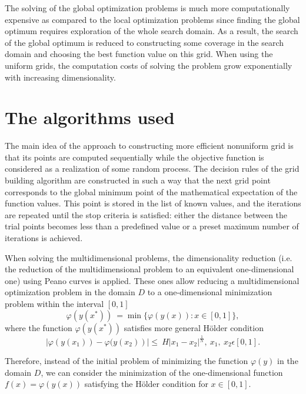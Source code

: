 \documentclass{svproc}
\begin{document}
The solving of the global optimization problems is much more computationally expensive as compared to the local optimization problems since finding the global optimum requires exploration of the whole search domain. As a result, the search of the  global optimum is reduced to constructing some coverage in the search domain and choosing the best function value on this grid. When using the uniform grids, the computation costs of solving the  problem grow exponentially with increasing dimensionality.



\section{The algorithms used}\label{SecA}

The main idea of the approach to constructing more efficient nonuniform grid is that its points are  computed sequentially while the objective function is considered as a realization of some random process. The decision rules of the grid building algorithm are constructed in such a way that the next  grid point corresponds to the global minimum point of the mathematical expectation of the function  values. This point is stored in the list of known values, and the iterations are repeated until the stop criteria is satisfied: either the distance between the trial points becomes less than a  predefined value or a preset maximum number of iterations is achieved.

When solving the multidimensional problems, the dimensionality reduction (i.e. the reduction of the  multidimensional problem to an equivalent one-dimensional one) using Peano curves is applied. These  ones allow reducing a multidimensional optimization problem in the domain $D$  to a one-dimensional  minimization problem within the interval $[0, 1]$
\begin{displaymath}
	\varphi(y(x^\ast))\ =\min\{\varphi(y(x)): x\in [0,1]\},
\end{displaymath}
where the function $\varphi(y(x^\ast))$ satisfies more general H{\"o}lder condition
\begin{displaymath}
	\left|\varphi (y \left(x_1\right))- \varphi (y \left(x_2\right)\right )|\le\ H\left|x_1-x_2\right|^\frac{1}{N},\ x_1,\ x_2\epsilon[0,1].
\end{displaymath} 


Therefore, instead of the initial problem of minimizing the function $\varphi(y)$ in the domain $D$,  we can consider the minimization of the one-dimensional function $f(x)=\varphi(y(x))$ satisfying  the H{\"o}lder condition for $ x\in [0,1]$.
\end{document}
